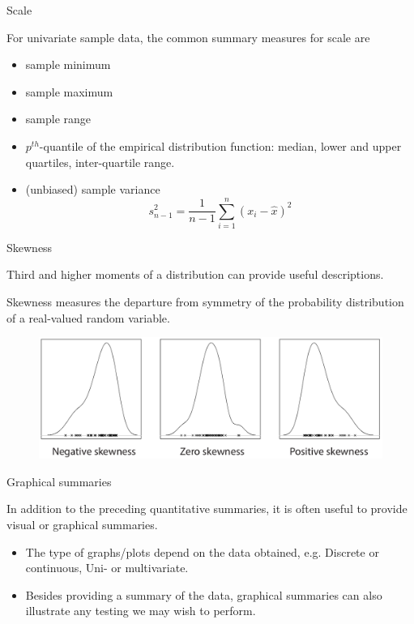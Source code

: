 \documentclass{beamer}
\begin{document}
\begin{frame}{Scale}

	For univariate sample data, the common summary measures for scale are
	\begin{itemize}
		\item sample minimum
		\item sample maximum
		\item sample range
		\item $p^{th}$-quantile of the empirical distribution function: median, lower and upper quartiles, inter-quartile range.
		\item (unbiased) sample variance
		\begin{equation*}
			s_{n-1}^2 = \frac{1}{n-1} \sum_{i=1}^n (x_i - \hat{x})^2
		\end{equation*}
	\end{itemize}

\end{frame}

\begin{frame}{Skewness}

	Third and higher moments of a distribution can provide useful descriptions.

	Skewness measures the departure from symmetry of the probability distribution of a real-valued random variable.

	\begin{figure}
		\includegraphics[width=0.9\linewidth]{skew.png}
	\end{figure}

\end{frame}

\begin{frame}{Graphical summaries}

	In addition to the preceding quantitative summaries, it is often useful to
	provide visual or graphical summaries.

	\begin{itemize}
		\item The type of graphs/plots depend on the data obtained, e.g. Discrete or continuous, Uni- or multivariate.
		\item Besides providing a summary of the data, graphical summaries can also illustrate any testing we may wish to perform.
	\end{itemize}

\end{frame}
\end{document}
